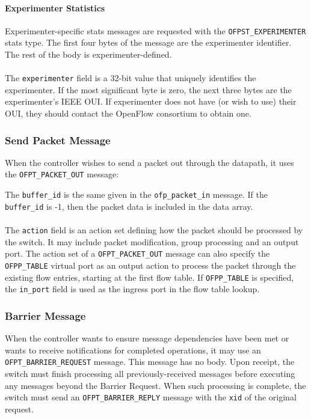 \paragraph{Experimenter Statistics}
Experimenter-specific stats messages are requested with the \verb|OFPST_EXPERIMENTER| stats type. The first four bytes of the message are the experimenter identifier. The rest of the body is experimenter-defined.
\\\\
The \verb|experimenter| field is a 32-bit value that uniquely identifies the experimenter. If the most significant byte is zero, the next three bytes are the experimenter's IEEE OUI. If experimenter does not have (or wish to use) their OUI, they should contact the OpenFlow consortium to obtain one. 

\subsubsection{Send Packet Message}
When the controller wishes to send a packet out through the datapath, it uses the \verb|OFPT_PACKET_OUT| message:


The \verb|buffer_id| is the same given in the \verb|ofp_packet_in| message.  If the \verb|buffer_id| is -1, then the packet data is included in the data array.
\\\\
The \verb|action| field is an action set defining how the packet should be processed by the switch. It may include packet modification, group processing and an output port. The action set of a \verb|OFPT_PACKET_OUT| message can also specify the \verb|OFPP_TABLE| virtual port as an output action to process the packet through the existing flow entries, starting at the first flow table. If \verb|OFPP_TABLE| is specified, the \verb|in_port| field is used as the ingress port in the flow table lookup.

\subsubsection{Barrier Message}
When the controller wants to ensure message dependencies have been met or wants to receive notifications for completed operations, it may use an \verb|OFPT_BARRIER_REQUEST| message.  This message has no body.  Upon receipt, the switch must finish processing all previously-received messages before executing any messages beyond the Barrier Request.  When such processing is complete, the switch must send an \verb|OFPT_BARRIER_REPLY| message with the \verb|xid| of the original request.

